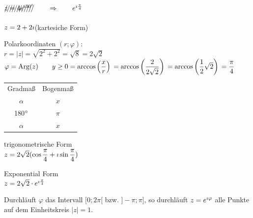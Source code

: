 $\xout{z=4e^{\i 30\degree}}\qquad \Rightarrow \qquad e^{\i \frac{\pi}{4}}$

\Bsp $z=2+2\imath $\qquad (kartesiche Form)

\clearpage
Polarkoordinaten $(r;\varphi)$:\\
$r=|z|=\sqrt{2^2+2^2}=\sqrt{8}=2\sqrt{2}$\\
$\varphi = \mathbin\text{Arg}(z)\qquad y\geq 0\\
=\arccos\left(\dfrac{x}{r}\right)\\
=\arccos\left(\dfrac{2}{2\sqrt{2}}\right)\\
=\arccos\left(\dfrac{1}{2}\sqrt{2}\right)\\
=\dfrac{\pi}{4}$

\begin{tabular}{c|c}
	Gradmaß & Bogenmaß\\
	$\alpha$ & $x$\\
	\hline
	\hline 180${^\circ}$ & $\pi$ \\ 
	$\alpha$ & $x$ \\ 
\end{tabular} 


trigonometrische Form\\
$z=2\sqrt{2}(\cos\dfrac{\pi}{4}+\imath \sin\dfrac{\pi}{4})$

Exponential Form\\
$z=2\sqrt{2}\cdot e^{\imath \frac{\pi}{4}}$


Durchläuft $\varphi$ das Intervall $[0;2\pi[$ bzw. $]-\pi;\pi]$, so durchläuft $z=e^{\imath \varphi}$ alle Punkte auf dem Einheitskreis $|z|=1$.


